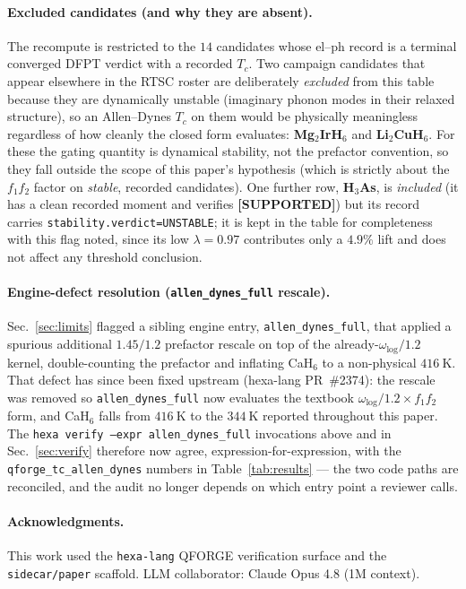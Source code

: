 \documentclass[11pt,a4paper]{article}
\providecommand{\tierGreen}{\textcolor{green!50!black}{\textbf{[SUPPORTED]}}}
\begin{document}
\paragraph{Excluded candidates (and why they are absent).}
The recompute is restricted to the $14$ candidates whose el--ph record is a
terminal converged DFPT verdict with a recorded $T_c$. Two campaign candidates
that appear elsewhere in the RTSC roster are deliberately \emph{excluded} from
this table because they are dynamically unstable (imaginary phonon modes in their
relaxed structure), so an Allen--Dynes $T_c$ on them would be physically
meaningless regardless of how cleanly the closed form evaluates:
\textbf{Mg$_2$IrH$_6$} and \textbf{Li$_2$CuH$_6$}. For these the gating quantity
is dynamical stability, not the prefactor convention, so they fall outside the
scope of this paper's hypothesis (which is strictly about the $f_1 f_2$ factor on
\emph{stable}, recorded candidates). One further row, \textbf{H$_3$As}, is
\emph{included} (it has a clean recorded moment and verifies \tierGreen) but its
record carries \texttt{stability.verdict=UNSTABLE}; it is kept in the table for
completeness with this flag noted, since its low $\lambda{=}0.97$ contributes only
a $4.9\%$ lift and does not affect any threshold conclusion.

\paragraph{Engine-defect resolution (\texttt{allen\_dynes\_full} rescale).}
Sec.~\ref{sec:limits} flagged a sibling engine entry,
\texttt{allen\_dynes\_full}, that applied a spurious additional $1.45/1.2$
prefactor rescale on top of the already-$\omega_{\log}/1.2$ kernel, double-counting
the prefactor and inflating CaH$_6$ to a non-physical $\SI{416}{\kelvin}$. That
defect has since been fixed upstream (hexa-lang PR~\#2374): the rescale was
removed so \texttt{allen\_dynes\_full} now evaluates the textbook
$\omega_{\log}/1.2 \times f_1 f_2$ form, and CaH$_6$ falls from
$\SI{416}{\kelvin}$ to the $\SI{344}{\kelvin}$ reported throughout this paper.
The \texttt{hexa verify --expr allen\_dynes\_full} invocations above and in
Sec.~\ref{sec:verify} therefore now agree, expression-for-expression, with the
\texttt{qforge\_tc\_allen\_dynes} numbers in Table~\ref{tab:results} --- the two
code paths are reconciled, and the audit no longer depends on which entry point
a reviewer calls.

\paragraph{Acknowledgments.}
This work used the \texttt{hexa-lang} QFORGE verification surface and the
\texttt{sidecar/paper} scaffold. LLM collaborator: Claude Opus 4.8 (1M context).

\nocite{*}


\end{document}
